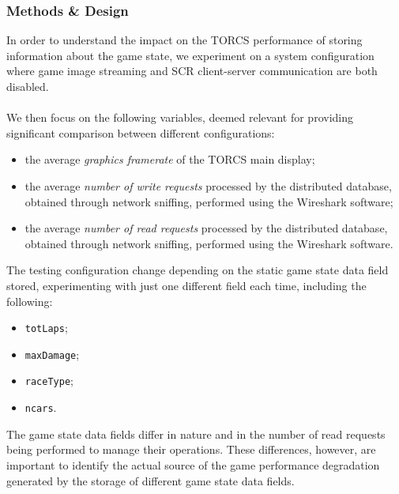 \subsubsection{Methods \& Design}
In order to understand the impact on the TORCS performance of storing information about the game state, we experiment on a system configuration where game image streaming and SCR client-server communication are both disabled. \\ \\
We then focus on the following variables, deemed relevant for providing significant comparison between different configurations:
\begin{itemize}
	\item the average \textit{graphics framerate} of the TORCS main display;
	\item the average \textit{number of write requests} processed by the distributed database, obtained through network sniffing, performed using the Wireshark software;
	\item the average \textit{number of read requests} processed by the distributed database, obtained through network sniffing, performed using the Wireshark software.
\end{itemize}
The testing configuration change depending on the static game state data field stored, experimenting with just one different field each time, including the following:
\begin{itemize}
	\item \texttt{totLaps};
	\item \texttt{maxDamage};
	\item \texttt{raceType};
	\item \texttt{ncars}.
\end{itemize}
The game state data fields differ in nature and in the number of read requests being performed to manage their operations. These differences, however, are important to identify the actual source of the game performance degradation generated by the storage of different game state data fields.

